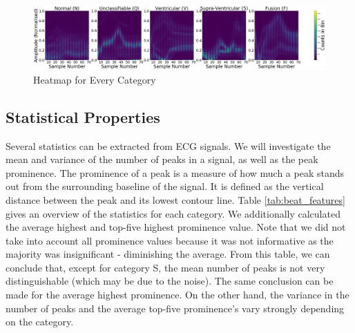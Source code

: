 \documentclass[a4paper,10pt,twocolumn]{article}
\begin{document}

\begin{figure}[ht]
    \centering
    \includegraphics[width=0.95\linewidth]{images/Heatmaps.png}
    \caption{Heatmap for Every Category}
    \label{fig:plot_heatmaps}
\end{figure}

\subsection{Statistical Properties}
Several statistics can be extracted from ECG signals. We will investigate the mean and variance of the number of peaks in a signal, as well as the peak prominence. The prominence of a peak is a measure of how much a peak stands out from the surrounding baseline of the signal. It is defined as the vertical distance between the peak and its lowest contour line. Table \ref{tab:beat_features} gives an overview of the statistics for each category. We additionally calculated the average highest and top-five highest prominence value. Note that we did not take into account all prominence values because it was not informative as the majority was insignificant - diminishing the average. From this table, we can conclude that, except for category S, the mean number of peaks is not very distinguishable (which may be due to the noise). The same conclusion can be made for the average highest prominence. On the other hand, the variance in the number of peaks and the average top-five prominence's vary strongly depending on the category.


\end{document}
